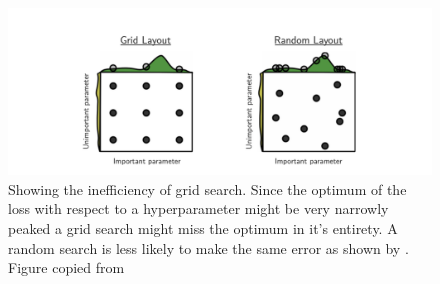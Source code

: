 \begin{figure}[H]
\centering
\hspace*{-1.3in}\includegraphics{../figures/randomsearch.png}
\caption{Showing the inefficiency of grid search. Since the optimum of the loss with respect to a hyperparameter might be very narrowly peaked a grid search might miss the optimum in it's entirety. A random search is less likely to make the same error as shown by \citet{Bergstra2012}. Figure copied from \citet{Bergstra2012}}\label{fig:randomsearch}
\end{figure} 
